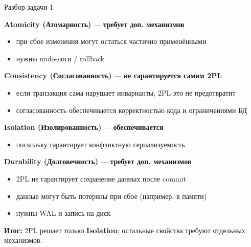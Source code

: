 \documentclass{beamer}
\begin{document}
\begin{frame}{Разбор задачи 1}

\pause
\textbf{Atomicity (Атомарность)} — \textbf{требует доп. механизмов}
\small
\begin{itemize}
    \item при сбое изменения могут остаться частично применёнными
    \item нужны undo-логи / rollback
\end{itemize}

\vspace{0.7em}

\pause
\textbf{Consistency (Согласованность)} — \textbf{не гарантируется самим 2PL}
\small
\begin{itemize}
    \item если транзакция сама нарушает инварианты, 2PL это не предотвратит
    \item согласованность обеспечивается корректностью кода и ограничениями БД
\end{itemize}

\vspace{0.7em}

\pause
\textbf{Isolation (Изолированность)} — \textbf{обеспечивается}
\begin{itemize}
    \small
    \item поскольку гарантирует конфликтную сериализуемость
\end{itemize}

\vspace{0.7em}

\pause
\textbf{Durability (Долговечность)} — \textbf{требует доп. механизмов}
\small
\begin{itemize}
    \item 2PL не гарантирует сохранение данных после commit
    \item данные могут быть потеряны при сбое (например, в памяти)
    \item нужны WAL и запись на диск
\end{itemize}

\vspace{0.7em}

\textbf{Итог:} 2PL решает только \textbf{Isolation}; остальные свойства требуют
отдельных механизмов.

\end{frame}

\end{document}
